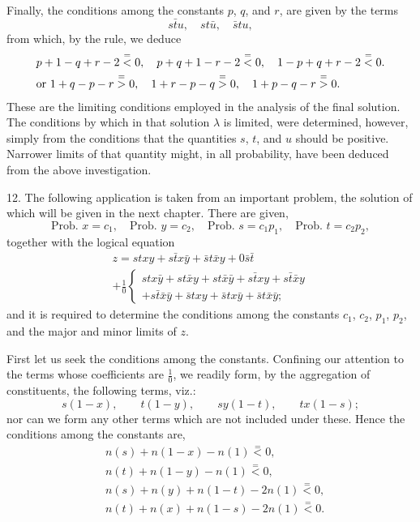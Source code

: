 \documentclass[oneside]{book}
\begin{document}
Finally, the conditions among the constants $p$, $q$, and $r$, are
given by the terms
\[
  s\bar{t}u, \quad st\bar{u}, \quad \bar{s}tu,
\]
from which, by the rule, we deduce
\begin{align*}
& p + 1 - q + r - 2 \stackrel{=}{<} 0, \quad
  p + q + 1 - r - 2 \stackrel{=}{<} 0, \quad
  1 - p + q + r - 2 \stackrel{=}{<} 0. \\
&\text{or } \hfill
  1 + q - p - r \stackrel{=}{>} 0, \quad
  1 + r - p - q \stackrel{=}{>} 0, \quad
  1 + p - q - r \stackrel{=}{>} 0. \hfill
\end{align*}
These are the limiting conditions employed in the analysis of
the final solution. The conditions by which in that solution $\lambda$ is
limited, were determined, however, simply from the conditions
that the quantities $s$, $t$, and $u$ should be positive. Narrower
limits of that quantity might, in all probability, have been deduced from the above investigation.

12. The following application is taken from an important problem,
the solution of which will be given in the next chapter.
There are given,
\[
  \text{Prob. }x = c_1,   \quad
  \text{Prob. }y = c_2,   \quad
  \text{Prob. }s = c_1p_1,\quad
  \text{Prob. }t = c_2p_2,
\]
together with the logical equation
\[
\begin{split}
  z = stxy + s\bar{t}x\bar{y} + \bar{s}t\bar{x}y + 0\bar{s}\bar{t} \\
  + \frac{1}{0}\left\{
  \begin{split}
    stx\bar{y} + st\bar{x}y + st\bar{x}\bar{y} + s\bar{t}xy
      + s\bar{t}\bar{x}y   \\
    + s\bar{t}\bar{x}\bar{y} + \bar{s}txy + \bar{s}tx\bar{y}
      + \bar{s}t\bar{x}\bar{y};
\end{split}
\right.
\end{split}
\]
and it is required to determine the conditions among the constants
$c_1$, $c_2$, $p_1$, $p_2$, and the major and minor limits of $z$.

First let us seek the conditions among the constants. Confining
our attention to the terms whose coefficients are $\frac{1}{0}$, we
readily form, by the aggregation of constituents, the following
terms, viz.:
\[
s(1-x), \qquad t(1-y), \qquad sy(1-t),\qquad  tx(1-s);
\]
nor can we form any other terms which are not included under
these. Hence the conditions among the constants are,
\begin{align*}
&n(s) + n(1-x) - n(1) \stackrel{=}{<} 0,\\
&n(t) + n(1-y) - n(1) \stackrel{=}{<} 0,\\
&n(s) + n(y) + n(1-t) - 2n(1) \stackrel{=}{<} 0,\\
&n(t) + n(x) + n(1-s) - 2n(1) \stackrel{=}{<} 0.
\end{align*}
\end{document}
